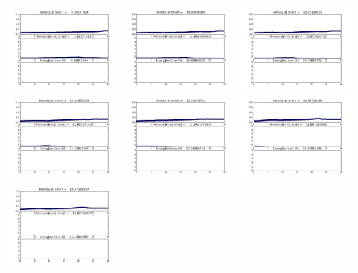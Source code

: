 \documentclass[11pt]{article}
\begin{document}
\vskip 10pt 
\includegraphics[width=0.316666666667\textwidth]{frame0013fig1.png}
\vskip 10pt 
\includegraphics[width=0.316666666667\textwidth]{frame0014fig1.png}
\vskip 10pt 
\includegraphics[width=0.316666666667\textwidth]{frame0015fig1.png}
\vskip 10pt 
\includegraphics[width=0.316666666667\textwidth]{frame0016fig1.png}
\vskip 10pt 
\includegraphics[width=0.316666666667\textwidth]{frame0017fig1.png}
\vskip 10pt 
\includegraphics[width=0.316666666667\textwidth]{frame0018fig1.png}
\vskip 10pt 
\includegraphics[width=0.316666666667\textwidth]{frame0019fig1.png}
\end{document}
